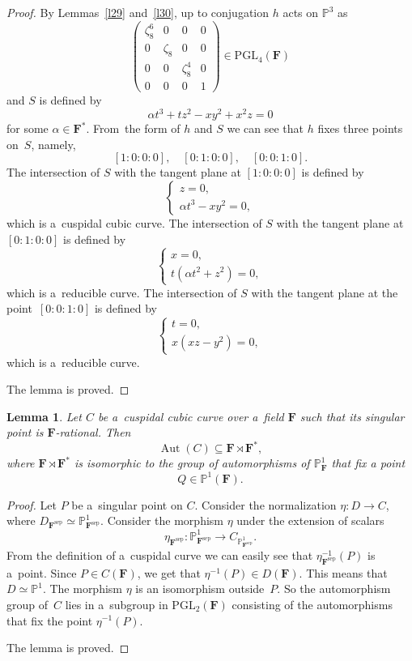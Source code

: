 \documentclass{amsart}
\numberwithin{equation}{section}
\theoremstyle{plain}
\newtheorem{lemma}{Lemma}
\theoremstyle{definition}
\theoremstyle{remark}
\begin{document}
\begin{proof}
By Lemmas~\ref{l29} and~\ref{l30}, up to conjugation $h$ acts on $\mathbb{P}^3$ as
$$
\begin{pmatrix}
\zeta_8^6 & 0 & 0 & 0\\
0 & \zeta_8 & 0 & 0\\
0 & 0 & \zeta_8^4 & 0\\
0 & 0 & 0 & 1
\end{pmatrix} \in \mathrm{PGL}_4(\mathbf{F})
$$
and $S$ is defined by
\begin{equation}
\label{eq5.11}
\alpha t^3+tz^2-xy^2+x^2z=0
\end{equation}
for some $\alpha \in \mathbf{F}^*$.
From~the form of $h$ and $S$
we can see that $h$ fixes three points on~$S$, namely,
$$
[1:0:0:0], \quad [0:1:0:0], \quad [0:0:1:0].
$$
The intersection of $S$ with the tangent plane at $[1:0:0:0]$ is defined by
$$
\begin{cases}
z=0,\\
\alpha t^3-xy^2=0,
\end{cases}
$$
which is a~cuspidal cubic curve. The intersection of $S$ with the tangent plane at~$[0:1:0:0]$ is defined by
$$
\begin{cases}
x=0,\\
t(\alpha t^2+z^2)=0,
\end{cases}
$$
which is a~reducible curve. The intersection of $S$ with the tangent plane at the point~\mbox{$[0:0:1:0]$} is defined by
$$
\begin{cases}
t=0,\\
x(xz-y^2)=0,
\end{cases}
$$
which is a~reducible curve.

The lemma is proved.
\end{proof}

\begin{lemma}
\label{l38}
Let $C$ be a~cuspidal cubic curve over a~field $\mathbf{F}$ such that its singular point is $\mathbf{F}$-rational. Then
$$
\operatorname{Aut}(C) \subseteq \mathbf{F} \rtimes \mathbf{F}^*,
$$
where $\mathbf{F} \rtimes \mathbf{F}^*$ is isomorphic to the group of automorphisms of $\mathbb{P}^1_{\mathbf{F}}$ that fix a point
$$
Q \in \mathbb{P}^1(\mathbf{F}).
$$
\end{lemma}

\begin{proof}
Let $P$ be a~singular point on $C$. Consider the normalization $\eta \colon D \to C$, where $D_{\mathbf{F}^{\mathrm{sep}}} \simeq \mathbb{P}^1_{\mathbf{F}^{\mathrm{sep}}}$. Consider the morphism $\eta$ under the extension of scalars
$$
\eta_{\mathbf{F}^{\mathrm{sep}}} \colon \mathbb{P}^1_{\mathbf{F}^{\mathrm{sep}}} \to C_{ \mathbb{P}^1_{\mathbf{F}^{\mathrm{sep}}}}.
$$
From the definition of a~cuspidal curve we can easily see that $\eta^{-1}_{\mathbf{F}^{\mathrm{sep}}}(P)$ is a~point. Since $P \in C(\mathbf{F})$, we get that $\eta^{-1}(P) \in D(\mathbf{F})$. This means that $D \simeq \mathbb{P}^1$. The morphism $\eta$ is an isomorphism outside~$P$. So the automorphism group of~$C$ lies in a~subgroup in $\mathrm{PGL}_2(\mathbf{F})$ consisting of the automorphisms that fix the point $\eta^{-1}(P)$.

The lemma is proved.
\end{proof}
\end{document}
